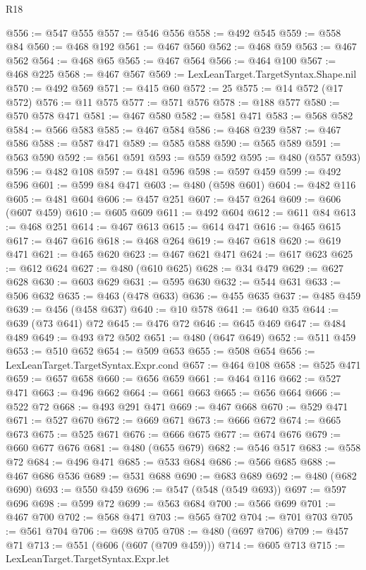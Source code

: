 \begin{lexlean}{R18}
\begin{coremodule}
{{{{{{{{{{{{{{{{{{{{{{{{{{{{{{{{{{{{{{{{{{{{{{{{{{{{{{{{{{{{{{{{{{{{{{{{{{{{{{{{{{{{{{{{{{{{{{{{{{{{{{{{{{{{{@556 := @547 @555
@557 := @546 @556
@558 := @492 @545
@559 := @558 @84
@560 := @468 @192
@561 := @467 @560
@562 := @468 @59
@563 := @467 @562
@564 := @468 @65
@565 := @467 @564
@566 := @464 @100
@567 := @468 @225
@568 := @467 @567
@569 := LexLeanTarget.TargetSyntax.Shape.nil
@570 := @492 @569
@571 := @415 @60
@572 := 25
@575 := @14 @572 (@17 @572)
@576 := @11 @575
@577 := @571 @576
@578 := @188 @577
@580 := @570 @578 @471
@581 := @467 @580
@582 := @581 @471
@583 := @568 @582
@584 := @566 @583
@585 := @467 @584
@586 := @468 @239
@587 := @467 @586
@588 := @587 @471
@589 := @585 @588
@590 := @565 @589
@591 := @563 @590
@592 := @561 @591
@593 := @559 @592
@595 := @480 (@557 @593)
@596 := @482 @108
@597 := @481 @596
@598 := @597 @459
@599 := @492 @596
@601 := @599 @84 @471
@603 := @480 (@598 @601)
@604 := @482 @116
@605 := @481 @604
@606 := @457 @251
@607 := @457 @264
@609 := @606 (@607 @459)
@610 := @605 @609
@611 := @492 @604
@612 := @611 @84
@613 := @468 @251
@614 := @467 @613
@615 := @614 @471
@616 := @465 @615
@617 := @467 @616
@618 := @468 @264
@619 := @467 @618
@620 := @619 @471
@621 := @465 @620
@623 := @467 @621 @471
@624 := @617 @623
@625 := @612 @624
@627 := @480 (@610 @625)
@628 := @34 @479
@629 := @627 @628
@630 := @603 @629
@631 := @595 @630
@632 := @544 @631
@633 := @506 @632
@635 := @463 (@478 @633)
@636 := @455 @635
@637 := @485 @459
@639 := @456 (@458 @637)
@640 := @10 @578
@641 := @640 @35
@644 := @639 (@73 @641) @72
@645 := @476 @72
@646 := @645 @469
@647 := @484 @489
@649 := @493 @72 @502
@651 := @480 (@647 @649)
@652 := @511 @459
@653 := @510 @652
@654 := @509 @653
@655 := @508 @654
@656 := LexLeanTarget.TargetSyntax.Expr.cond
@657 := @464 @108
@658 := @525 @471
@659 := @657 @658
@660 := @656 @659
@661 := @464 @116
@662 := @527 @471
@663 := @496 @662
@664 := @661 @663
@665 := @656 @664
@666 := @522 @72
@668 := @493 @291 @471
@669 := @467 @668
@670 := @529 @471
@671 := @527 @670
@672 := @669 @671
@673 := @666 @672
@674 := @665 @673
@675 := @525 @671
@676 := @666 @675
@677 := @674 @676
@679 := @660 @677 @676
@681 := @480 (@655 @679)
@682 := @546 @517
@683 := @558 @72
@684 := @496 @471
@685 := @533 @684
@686 := @566 @685
@688 := @467 @686 @536
@689 := @531 @688
@690 := @683 @689
@692 := @480 (@682 @690)
@693 := @550 @459
@696 := @547 (@548 (@549 @693))
@697 := @597 @696
@698 := @599 @72
@699 := @563 @684
@700 := @566 @699
@701 := @467 @700
@702 := @568 @471
@703 := @565 @702
@704 := @701 @703
@705 := @561 @704
@706 := @698 @705
@708 := @480 (@697 @706)
@709 := @457 @71
@713 := @551 (@606 (@607 (@709 @459)))
@714 := @605 @713
@715 := LexLeanTarget.TargetSyntax.Expr.let
}}}}}}}}}}}}}}}}}}}}}}}}}}}}}}}}}}}}}}}}}}}}}}}}}}}}}}}}}}}}}}}}}}}}}}}}}}}}}}}}}}}}}}}}}}}}}}}}}}}}}}}}}}}}}
\end{coremodule}
\end{lexlean}
